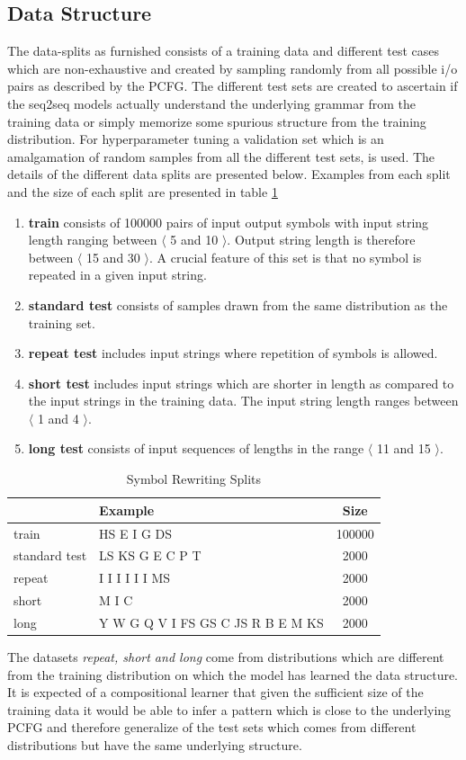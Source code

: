 \subsection{Data Structure}
The data-splits as furnished \citep{Weber2018} consists of a training data and different test cases which are non-exhaustive and created by sampling randomly from all possible i/o pairs as described by the PCFG. The different test sets are created to ascertain if the seq2seq models actually understand the underlying grammar from the training data or simply memorize some spurious structure from the training distribution. For hyperparameter tuning a validation set which is an amalgamation of random samples from all the different test sets, is used. The details of the different data splits are presented below. Examples from each split and the size of each split are presented in table \ref{sr:stats}
\begin{enumerate}
	\item \textbf{train} consists of 100000 pairs of input output symbols with input string length ranging between $\langle$ 5 and 10 $\rangle$. Output string length is therefore between $\langle$ 15 and 30 $\rangle$. A crucial feature of this set is that no symbol is repeated in a given input string.
	\item \textbf{standard test} consists of samples drawn from the same distribution as the training set.
	\item \textbf{repeat test} includes input strings where repetition of symbols is allowed.
	\item \textbf{short test} includes input strings which are shorter in length as compared to the input strings in the training data. The input string length ranges between $\langle$ 1 and 4 $\rangle$.
	\item \textbf{long test} consists of input sequences of lengths in the range $\langle$ 11 and 15 $\rangle$.
\end{enumerate}

\begin{table}[ht]
	\centering
	\begin{tabular}{l|lc}
		& Example & Size\\
		\hline
		train & HS E I G DS  & 100000 \\
		standard test & LS KS G E C P T & 2000 \\
		repeat & I I I I I I MS & 2000 \\
		short & M I C & 2000 \\
		long & Y W G Q V I FS GS C JS R B E M KS & 2000 \\
	\end{tabular}
	\caption{Symbol Rewriting Splits}
	\label{sr:stats}
\end{table}

The datasets \textit{repeat, short and long} come from distributions which are different from the training distribution on which the model has learned the data structure. It is expected of a compositional learner that given the sufficient size of the training data it would be able to infer a pattern which is close to the underlying PCFG and therefore generalize of the test sets which comes from different distributions but have the same underlying structure.